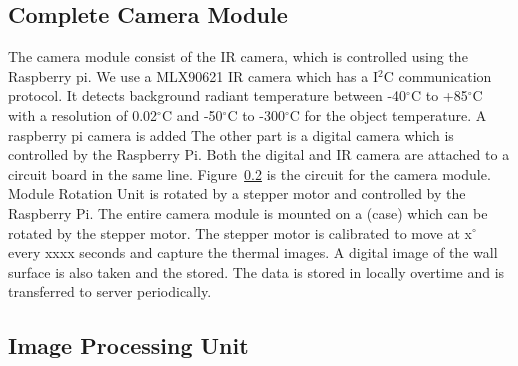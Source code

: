 \documentclass{sig-alternate}
\begin{document}
	\subsection{Complete Camera Module}
	The camera module consist of the IR camera, which is controlled using the Raspberry pi. We use a MLX90621 IR camera which has a I$^2$C communication protocol. It detects background radiant temperature between -40$^{\circ}$C to +85$^{\circ}$C with a resolution of 0.02$^{\circ}$C and -50$^{\circ}$C to -300$^{\circ}$C for the object temperature. A raspberry pi camera is added 	The other part is a digital camera which is controlled by the Raspberry Pi. Both the digital and IR camera are attached to a circuit board in the same line. Figure~\ref{} is the circuit for the camera module.\\	
	\indent Module Rotation Unit is rotated by a stepper motor and controlled by the Raspberry Pi. The entire camera module is mounted on a (case) which can be rotated by the stepper motor. The stepper motor is calibrated to move at x$^{\circ}$ every xxxx seconds and capture the thermal images. A digital image of the wall surface is also taken and the stored. The data is stored in locally overtime and is transferred to server periodically.
	
	\subsection{Image Processing Unit}
\end{document}
